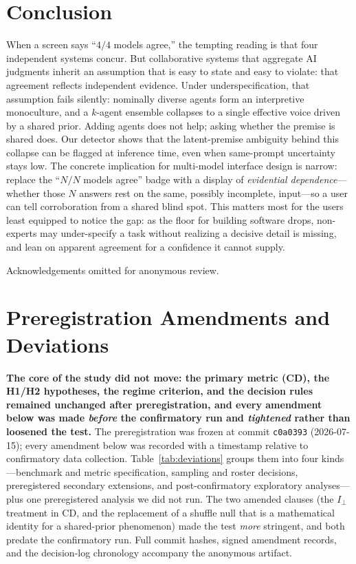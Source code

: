 \documentclass[acmsmall,screen,review,anonymous]{acmart}
\newcommand{\cd}{\textsf{CD}}
\newcommand{\iperp}{\ensuremath{I_\perp}}
\begin{document}
\section{Conclusion}
\label{sec:conclusion}
When a screen says ``$4/4$ models agree,'' the tempting reading is that four independent systems concur. But
collaborative systems that aggregate AI judgments inherit an assumption that is easy to state and easy
to violate: that agreement reflects independent evidence. Under underspecification, that assumption fails
silently: nominally diverse agents form an interpretive monoculture, and a $k$-agent ensemble collapses to a
single effective voice driven by a shared prior. Adding agents does not help; asking whether the premise is
shared does. Our detector shows that the latent-premise ambiguity behind this collapse can be flagged at
inference time, even when same-prompt uncertainty stays low. The concrete implication for multi-model interface design is narrow:
replace the ``$N/N$ models agree'' badge with a display of \emph{evidential dependence}---whether those $N$
answers rest on the same, possibly incomplete, input---so a user can tell corroboration from a shared blind
spot. This matters most for the users least equipped to notice the gap: as the floor for building software
drops, non-experts may under-specify a task without realizing a decisive detail is missing, and lean on
apparent agreement for a confidence it cannot supply.

\begin{acks}
Acknowledgements omitted for anonymous review.
\end{acks}




\appendix
\section{Preregistration Amendments and Deviations}
\label{app:deviations}

\textbf{The core of the study did not move: the primary metric (\cd), the H1/H2 hypotheses, the regime
criterion, and the decision rules remained unchanged after preregistration, and every amendment below was
made \emph{before} the confirmatory run and \emph{tightened} rather than loosened the test.}
The preregistration was frozen at commit \texttt{c0a0393} (2026-07-15); every amendment below
was recorded with a timestamp relative to confirmatory data collection.
Table~\ref{tab:deviations} groups them into four kinds---benchmark and metric specification,
sampling and roster decisions, preregistered secondary extensions, and post-confirmatory
exploratory analyses---plus one preregistered analysis we did not run. The
two amended clauses (the \iperp{} treatment in \cd, and the replacement of a shuffle null that
is a mathematical identity for a shared-prior phenomenon) made the test \emph{more} stringent,
and both predate the confirmatory run. Full commit hashes, signed amendment records, and the
decision-log chronology accompany the anonymous artifact.
\end{document}
